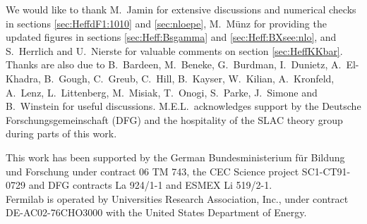 \acknowledgements

We would like to thank M.\ Jamin for extensive discussions and
numerical checks in sections \ref{sec:HeffdF1:1010} and
\ref{sec:nloepe}, M.\ M{\"u}nz for providing the updated figures in
sections \ref{sec:Heff:Bsgamma} and \ref{sec:Heff:BXsee:nlo}, and
S.\ Herrlich and U.\ Nierste for valuable comments on section
\ref{sec:HeffKKbar}.
\\
Thanks are also due to B.\ Bardeen, M.\ Beneke, G.\ Burdman,
I.\ Dunietz, A.\ El-Khadra, B.\ Gough, C.\ Greub, C.\ Hill, B.\ Kayser,
W.\ Kilian, A.\ Kronfeld, A.\ Lenz, L.\ Littenberg, M.\ Misiak,
T.\ Onogi, S.\ Parke, J.\ Simone and B.\ Winstein for useful
discussions.  M.E.L.\ acknowledges support by the Deutsche
Forschungsgemeinschaft (DFG) and the hospitality of the SLAC theory
group during parts of this work.

This work has been supported by the German Bundesministerium f\"ur
Bildung und Forschung under contract 06 TM 743, the CEC Science project
SC1-CT91-0729 and DFG contracts La 924/1-1 and ESMEX Li 519/2-1.
\\
Fermilab is operated by Universities Research Association, Inc., 
under contract DE-AC02-76CHO3000 with the United States Department
of Energy.
